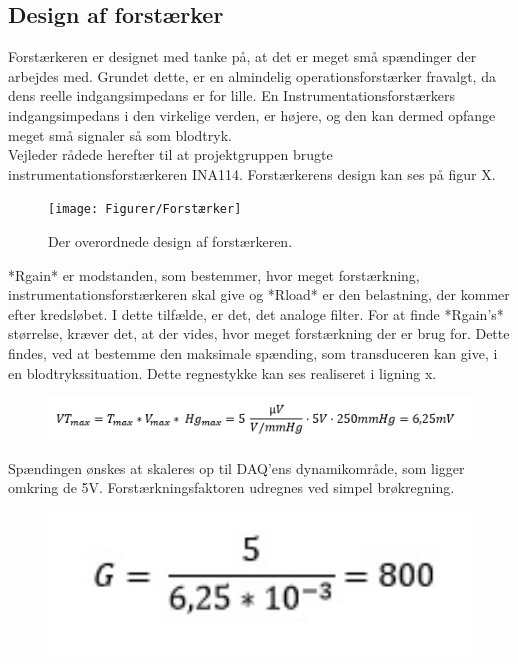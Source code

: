 \subsection{Design af forstærker}
Forstærkeren er designet med tanke på, at det er meget små spændinger der arbejdes med. Grundet dette, er en almindelig operationsforstærker fravalgt, da dens reelle indgangsimpedans er for lille. En Instrumentationsforstærkers indgangsimpedans i den virkelige verden, er højere, og den kan dermed opfange meget små signaler så som blodtryk.\\
Vejleder rådede herefter til at projektgruppen brugte instrumentationsforstærkeren INA114. Forstærkerens design kan ses på figur X.\\ 
\begin{figure}[h]
	\centering
	\texttt{[image: Figurer/Forstærker]}
	\caption{Der overordnede design af forstærkeren.}\label{labelpic}
\end{figure}
*Rgain* er modstanden, som bestemmer, hvor meget forstærkning, instrumentationsforstærkeren skal give og *Rload* er den belastning, der kommer efter kredsløbet. I dette tilfælde, er det, det analoge filter. For at finde *Rgain’s* størrelse, kræver det, at der vides, hvor meget forstærkning der er brug for. Dette findes, ved at bestemme den maksimale spænding, som transduceren kan give, i en blodtrykssituation. Dette regnestykke kan ses realiseret i ligning x.\\
\begin{figure}[h]
	\centering
	\includegraphics[width=1\textwidth]{Figurer/LigningSara}
\end{figure}

Spændingen ønskes at skaleres op til DAQ’ens dynamikområde, som ligger omkring de 5V. Forstærkningsfaktoren udregnes ved simpel brøkregning. \\

\begin{figure}[h]
	\centering
	\includegraphics[width=1\textwidth]{Figurer/ligningtilgain}
\end{figure}

